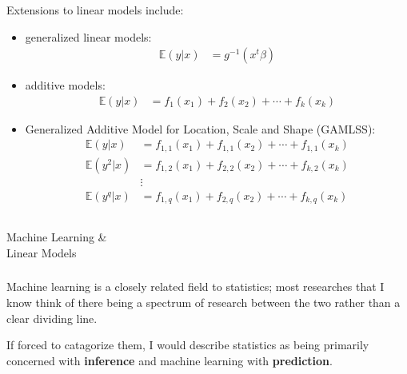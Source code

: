 \begin{frame}[fragile] \frametitle{}

Extensions to linear models include: \pause
\begin{itemize} \setlength\itemsep{0em}
\item generalized linear models:
\begin{align*}
\mathbb{E} (y | x) &= g^{-1}(x^t \beta)
\end{align*} \pause
\item additive models:
\begin{align*}
\mathbb{E} (y | x) &= f_1(x_1) + f_2(x_2) + \cdots + f_k(x_k)
\end{align*} \pause
\item Generalized Additive Model for Location, Scale and Shape (GAMLSS):
\begin{align*}
\mathbb{E} (y | x) &= f_{1,1}(x_1) + f_{1,1}(x_2) + \cdots + f_{1,1}(x_k) \\
\mathbb{E} (y^2 | x) &= f_{1,2}(x_1) + f_{2,2}(x_2) + \cdots + f_{k,2}(x_k) \\
&\vdots \\
\mathbb{E} (y^q | x) &= f_{1,q}(x_1) + f_{2,q}(x_2) + \cdots + f_{k,q}(x_k) \\
\end{align*}
\end{itemize}

\end{frame}

\begin{frame}[fragile] \frametitle{}

\begin{flushright}
{\color{yaleblue}\sc\fontsize{1cm}{1cm}\selectfont Machine Learning \& \\\medskip Linear Models}
\end{flushright}

\end{frame}

\begin{frame}[fragile] \frametitle{}

Machine learning is a closely related field to statistics; most
researches that I know think of there being a spectrum of research
between the two rather than a clear dividing line. \pause

If forced to catagorize them, I would describe statistics as
being primarily concerned with {\bf inference} and machine learning
with {\bf prediction}.

\end{frame}

